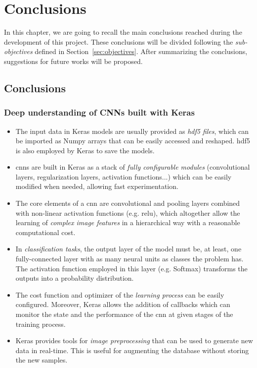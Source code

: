 \chapter{Conclusions}\label{ch:conclusions}
In this chapter, we are going to recall the main conclusions reached during the development of this project. These conclusions will be divided following the \emph{sub-objectives} defined in Section~\ref{sec:objectives}. After summarizing the conclusions, suggestions for future works will be proposed.

\section{Conclusions}
\subsection*{Deep understanding of CNNs built with Keras}
\begin{itemize}
	\item The input data in Keras models are usually provided as \emph{\gls{hdf5} files}, which can be imported as Numpy arrays that can be easily accessed and reshaped. \gls{hdf5} is also employed by Keras to save the models.
	\item \glspl{cnn} are built in Keras as a stack of \emph{fully configurable modules} (convolutional layers, regularization layers, activation functions...) which can be easily modified when needed, allowing fast experimentation.
	\item The core elements of a \gls{cnn} are convolutional and pooling layers combined with non-linear activation functions (e.g. \gls{relu}), which altogether allow the learning of \emph{complex image features} in a hierarchical way with a reasonable computational cost.
	\item In \emph{classification tasks}, the output layer of the model must be, at least, one fully-connected layer with as many neural units as classes the problem has. The activation function employed in this layer (e.g. Softmax) transforms the outputs into a probability distribution.
	\item The cost function and optimizer of the \emph{learning process} can be easily configured. Moreover, Keras allows the addition of callbacks which can monitor the state and the performance of the \gls{cnn} at given stages of the training process.
	\item Keras provides tools for \emph{image preprocessing} that can be used to generate new data in real-time. This is useful for augmenting the database without storing the new samples.
\end{itemize}

